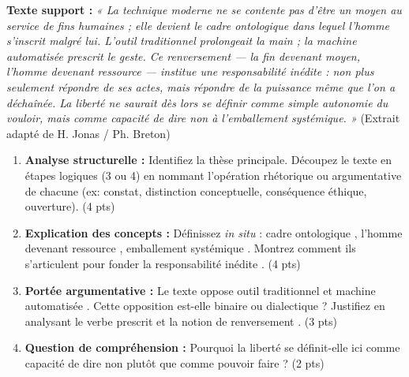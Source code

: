 \documentclass[11pt]{article}
\begin{document}
\begin{exercice}
\textbf{Texte support :} \textit{« La technique moderne ne se contente pas d'être un moyen au service de fins humaines ; elle devient le cadre ontologique dans lequel l'homme s'inscrit malgré lui. L'outil traditionnel prolongeait la main ; la machine automatisée prescrit le geste. Ce renversement — la fin devenant moyen, l'homme devenant ressource — institue une responsabilité inédite : non plus seulement répondre de ses actes, mais répondre de la puissance même que l'on a déchaînée. La liberté ne saurait dès lors se définir comme simple autonomie du vouloir, mais comme capacité de dire \og non \fg{} à l'emballement systémique. »} \hfill (Extrait adapté de H. Jonas / Ph. Breton)
\begin{enumerate}
    \item \textbf{Analyse structurelle :} Identifiez la thèse principale. Découpez le texte en étapes logiques (3 ou 4) en nommant l'opération rhétorique ou argumentative de chacune (ex: constat, distinction conceptuelle, conséquence éthique, ouverture). \hfill (4 pts)
    \item \textbf{Explication des concepts :} Définissez \textit{in situ} : \og cadre ontologique \fg{}, \og l'homme devenant ressource \fg{}, \og emballement systémique \fg{}. Montrez comment ils s'articulent pour fonder la \og responsabilité inédite \fg{}. \hfill (4 pts)
    \item \textbf{Portée argumentative :} Le texte oppose \og outil traditionnel \fg{} et \og machine automatisée \fg{}. Cette opposition est-elle binaire ou dialectique ? Justifiez en analysant le verbe \og prescrit \fg{} et la notion de \og renversement \fg{}. \hfill (3 pts)
    \item \textbf{Question de compréhension :} Pourquoi la liberté se définit-elle ici comme \og capacité de dire non \fg{} plutôt que comme pouvoir faire ? \hfill (2 pts)
\end{enumerate}
\end{exercice}
\end{document}

